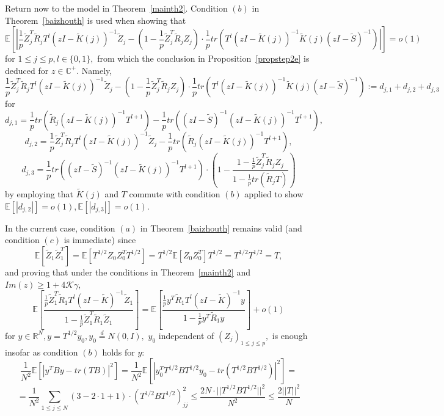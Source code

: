 \documentclass{article}
\numberwithin{equation}{section}
\begin{document}
Return now to the model in Theorem~\ref{mainth2}. Condition \((b)\) in Theorem~\ref{baizhouth} is used when showing that
\[\mathbb{E}[|\frac{1}{p}\tilde{Z}_j^T\tilde{R}_jT^l(zI-\tilde{K}(j))^{-1}\tilde{Z}_j-(1-\frac{1}{p}\tilde{Z}_j^T\tilde{R}_jZ_j)\cdot \frac{1}{p}tr(T^l(zI-\tilde{K}(j))^{-1}\tilde{K}(j)(zI-\tilde{S})^{-1})|]=o(1)\]
for \(1 \leq j \leq p, l \in \{0,1\},\) from which the conclusion in Proposition~\ref{propstep2e} is deduced for \(z \in \mathbb{C}^{+}.\) Namely,
\begin{equation}\label{diffdef}
    \frac{1}{p}\tilde{Z}_j^T\tilde{R}_jT^l(zI-\tilde{K}(j))^{-1}\tilde{Z}_j-(1-\frac{1}{p}\tilde{Z}_j^T\tilde{R}_jZ_j)\cdot \frac{1}{p}tr(T^l(zI-\tilde{K}(j))^{-1}\tilde{K}(j)(zI-\tilde{S})^{-1}):=d_{j,1}+d_{j,2}+d_{j,3}
\end{equation}
for
\[d_{j,1}=\frac{1}{p}tr(\tilde{R}_j(zI-\tilde{K}(j))^{-1}T^{l+1})-\frac{1}{p}tr((zI-\tilde{S})^{-1}(zI-\tilde{K}(j))^{-1}T^{l+1}),\]
\[d_{j,2}=\frac{1}{p}\tilde{Z}_j^T\tilde{R}_jT^l(zI-\tilde{K}(j))^{-1}\tilde{Z}_j-\frac{1}{p}tr(\tilde{R}_j(zI-\tilde{K}(j))^{-1}T^{l+1}),\]
\[d_{j,3}=\frac{1}{p}tr((zI-\tilde{S})^{-1}(zI-\tilde{K}(j))^{-1}T^{l+1}) \cdot (1-\frac{1-\frac{1}{p}\tilde{Z}_j^T\tilde{R}_jZ_j}{1-\frac{1}{p}tr(\tilde{R}_jT)})\]
by employing that \(\tilde{K}(j)\) and \(T\) commute with condition \((b)\) applied to show \(\mathbb{E}[|d_{j,2}|]=o(1),\mathbb{E}[|d_{j,3}|]=o(1).\) 
\par
In the current case, condition \((a)\) in Theorem~\ref{baizhouth} remains valid (and condition \((c)\) is immediate) since
\[\mathbb{E}[\tilde{Z}_1\tilde{Z}_1^T]=\mathbb{E}[T^{1/2}Z_0Z_0^TT^{1/2}]=T^{1/2}\mathbb{E}[Z_0Z_0^T]T^{1/2}=T^{1/2}T^{1/2}=T,\]
and proving that under the conditions in Theorem~\ref{mainth2} and \(Im(z) \geq 1+4\mathcal{K}\gamma,\) 
\begin{equation}\tag{\(U\)}\label{unmomeq}
    \mathbb{E}[\frac{\frac{1}{p}\tilde{Z}_1^T\tilde{R}_1T^l(zI-\tilde{K})^{-1}\tilde{Z}_1}{1-\frac{1}{p}\tilde{Z}_1^T\tilde{R}_1\tilde{Z}_1}]=\mathbb{E}[\frac{\frac{1}{p}y^T\tilde{R}_1T^l(zI-\tilde{K})^{-1}y}{1-\frac{1}{p}y^T\tilde{R}_1y}]+o(1)
\end{equation}
for \(y \in \mathbb{R}^N,y=T^{1/2}y_0, y_0 \overset{d}{=}N(0,I),\) \(y_0\) independent of \((Z_j)_{1 \leq j \leq p},\) is enough insofar as condition \((b)\) holds for \(y:\)
\[\frac{1}{N^2}\mathbb{E}[|y^{T}By-tr(TB)|^2]=\frac{1}{N^2}\mathbb{E}[|y_0^{T}T^{1/2}BT^{1/2}y_0-tr(T^{1/2}BT^{1/2})|^2]=\]
\[=\frac{1}{N^2}\sum_{1 \leq j \leq N}{(3-2\cdot 1+1)\cdot (T^{1/2}BT^{1/2})^2_{jj}} \leq \frac{2N \cdot ||T^{1/2}BT^{1/2}||^2}{N^2} \leq \frac{2||T||^2}{N}\]
\end{document}
